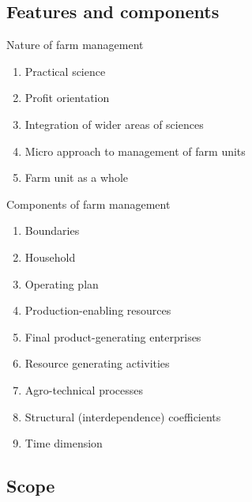 \documentclass[12pt,ignorenonframetext,aspectratio=169]{beamer}
\providecommand{\tightlist}{%
  \setlength{\itemsep}{0pt}\setlength{\parskip}{0pt}}
\begin{document}
\hypertarget{features-and-components}{%
\subsection{Features and components}\label{features-and-components}}

\begin{frame}{Nature of farm management}
\protect\hypertarget{nature-of-farm-management}{}

\begin{enumerate}
\tightlist
\item
  Practical science
\item
  Profit orientation
\item
  Integration of wider areas of sciences
\item
  Micro approach to management of farm units
\item
  Farm unit as a whole
\end{enumerate}

\end{frame}

\begin{frame}{Components of farm management}
\protect\hypertarget{components-of-farm-management}{}

\begin{enumerate}
\tightlist
\item
  Boundaries
\item
  Household
\item
  Operating plan
\item
  Production-enabling resources
\item
  Final product-generating enterprises
\item
  Resource generating activities
\item
  Agro-technical processes
\item
  Structural (interdependence) coefficients
\item
  Time dimension
\end{enumerate}

\end{frame}

\hypertarget{scope}{%
\subsection{Scope}\label{scope}}
\end{document}
